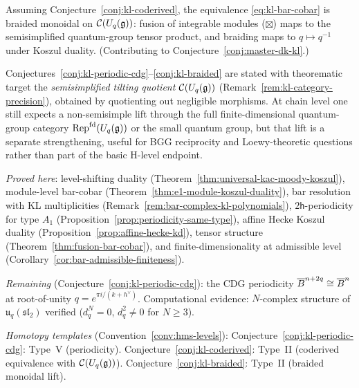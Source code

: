 \begin{conjecture}\label{conj:kl-braided}
Assuming Conjecture~\textup{\ref{conj:kl-coderived}}, the equivalence
\eqref{eq:kl-bar-cobar} is braided monoidal on
$\mathcal{C}(U_q(\mathfrak{g}))$: fusion of integrable
modules ($\boxtimes$) maps to the semisimplified quantum-group tensor
product, and braiding maps to
$q \mapsto q^{-1}$ under Koszul duality.
(Contributing to Conjecture~\ref{conj:master-dk-kl}.)
\end{conjecture}

\begin{remark}\label{rem:kl-conjecture-target}
Conjectures~\ref{conj:kl-periodic-cdg}--\ref{conj:kl-braided} are stated
with theorematic target the \emph{semisimplified tilting quotient}
$\mathcal{C}(U_q(\mathfrak{g}))$ (Remark~\ref{rem:kl-category-precision}),
obtained by quotienting out negligible morphisms.
At chain level one still expects a non-semisimple lift through the
full finite-dimensional quantum-group category
$\mathrm{Rep}^{\mathrm{fd}}(U_q(\mathfrak{g}))$ or the small quantum group,
but that lift is a separate strengthening, useful for BGG reciprocity
and Loewy-theoretic questions rather than part of the basic H-level
endpoint.
\end{remark}

\begin{remark}\label{rem:kl-evidence}
\emph{Proved here}: level-shifting duality (Theorem~\ref{thm:universal-kac-moody-koszul}), module-level bar-cobar (Theorem~\ref{thm:e1-module-koszul-duality}), bar resolution with KL multiplicities (Remark~\ref{rem:bar-complex-kl-polynomials}), $2\mathsf{h}$-periodicity for type $A_1$ (Proposition~\ref{prop:periodicity-same-type}), affine Hecke Koszul duality (Proposition~\ref{prop:affine-hecke-kd}), tensor structure (Theorem~\ref{thm:fusion-bar-cobar}), and finite-dimensionality at admissible level (Corollary~\ref{cor:bar-admissible-finiteness}).

\emph{Remaining} (Conjecture~\ref{conj:kl-periodic-cdg}): the CDG periodicity $\overline{B}^{n+2q} \cong \overline{B}^n$ at root-of-unity $q = e^{\pi i/(k+h^\vee)}$.  Computational evidence: $N$-complex structure of $\mathfrak{u}_q(\mathfrak{sl}_2)$ verified ($d_q^N = 0$, $d_q^2 \neq 0$ for $N \geq 3$).

\emph{Homotopy templates} (Convention~\ref{conv:hms-levels}): Conjecture~\ref{conj:kl-periodic-cdg}: Type~V (periodicity).  Conjecture~\ref{conj:kl-coderived}: Type~II (coderived equivalence with $\mathcal{C}(U_q(\mathfrak{g}))$).  Conjecture~\ref{conj:kl-braided}: Type~II (braided monoidal lift).
\end{remark}

